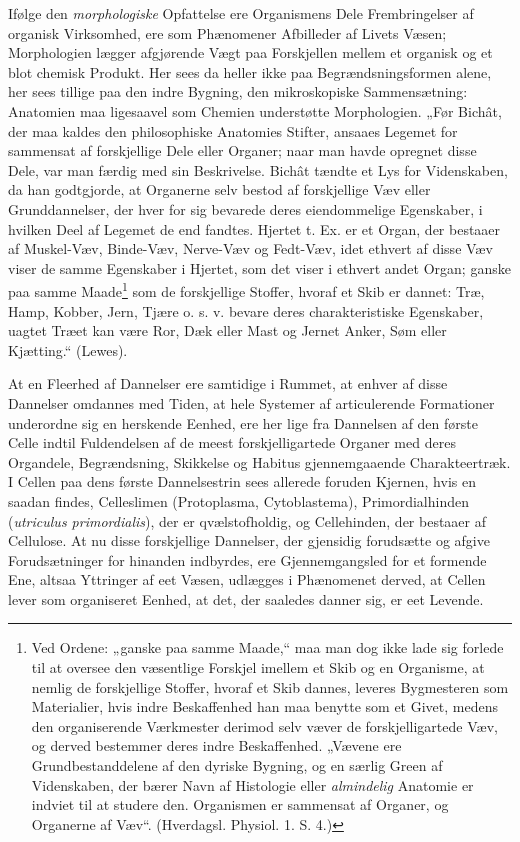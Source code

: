 \documentclass[12pt,a4paper]{book}
\begin{document}
Ifølge den \emph{morphologiske} Opfattelse ere Organismens Dele
Frembringelser af organisk Virksomhed, ere som Phænomener
Afbilleder af Livets Væsen; Morphologien lægger afgjørende Vægt
paa Forskjellen mellem et organisk og et blot chemisk Produkt. Her
sees da heller ikke paa Begrændsningsformen alene, her sees tillige
paa den indre Bygning, den mikroskopiske Sammensætning: Anatomien
maa ligesaavel som Chemien understøtte Morphologien. „Før Bichât,
der maa kaldes den philosophiske Anatomies Stifter, ansaaes
Legemet for sammensat af forskjellige Dele eller Organer; naar man
havde opregnet disse Dele, var man færdig med sin Beskrivelse.
Bichât tændte et Lys for Videnskaben, da han godtgjorde, at
Organerne selv bestod af forskjellige Væv eller Grunddannelser,
\setcounter{footnote}{0}
der hver for sig bevarede deres eiendommelige Egenskaber, i hvilken
Deel af Legemet de end fandtes. Hjertet t. Ex. er et Organ, der
bestaaer af Muskel-Væv, Binde-Væv, Nerve-Væv og Fedt-Væv, idet
ethvert af disse Væv viser de samme Egenskaber i Hjertet, som det
viser i ethvert andet Organ; ganske paa samme
Maade\footnote{Ved Ordene: „ganske paa samme Maade,“ maa man dog
ikke lade sig forlede til at oversee den væsentlige Forskjel
imellem et Skib og en Organisme, at nemlig de forskjellige Stoffer,
hvoraf et Skib dannes, leveres Bygmesteren som Materialier, hvis
indre Beskaffenhed han maa benytte som et Givet, medens den
organiserende Værkmester derimod selv væver de forskjelligartede
Væv, og derved bestemmer deres indre Beskaffenhed. „Vævene ere
Grundbestanddelene af den dyriske Bygning, og en særlig Green af
Videnskaben, der bærer Navn af Histologie eller \emph{almindelig}
Anatomie er indviet til at studere den. Organismen er sammensat af
Organer, og Organerne af Væv“. (Hverdagsl. Physiol. 1. S. 4.)}
som de forskjellige Stoffer, hvoraf et Skib er dannet: Træ, Hamp,
Kobber, Jern, Tjære o. s. v. bevare deres charakteristiske
Egenskaber, uagtet Træet kan være Ror, Dæk eller Mast og Jernet
Anker, Søm eller Kjætting.“ (Lewes).

At en Fleerhed af Dannelser ere samtidige i Rummet, at enhver af
disse Dannelser omdannes med Tiden, at hele Systemer af
articulerende Formationer underordne sig en herskende Eenhed, ere
her lige fra Dannelsen af den første Celle indtil Fuldendelsen af de
meest forskjelligartede Organer med deres Organdele, Begrændsning,
Skikkelse og Habitus gjennemgaaende Charakteertræk. I Cellen paa
dens første Dannelsestrin sees allerede foruden Kjernen, hvis en
saadan findes, Celleslimen (Protoplasma, Cytoblastema),
Primordialhinden (\textit{utriculus primordialis}), der er qvælstofholdig,
og Cellehinden, der bestaaer af Cellulose. At nu disse forskjellige
Dannelser, der gjensidig forudsætte og afgive Forudsætninger for
hinanden indbyrdes, ere Gjennemgangsled for et formende
\setcounter{footnote}{0}
Ene, altsaa Yttringer af eet Væsen, udlægges i Phænomenet derved,
at Cellen lever som organiseret Eenhed, at det, der saaledes danner
sig, er eet Levende.
\end{document}
